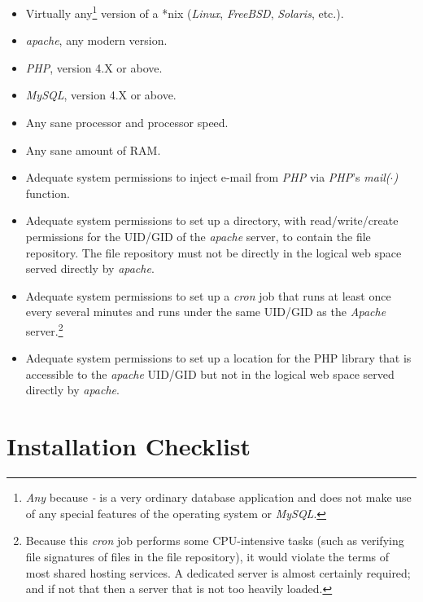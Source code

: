 \begin{itemize}
\item Virtually any\footnote{\emph{Any} because  
      \emph{\productbasename{}-\productversion{}} is a very ordinary
      database application and does not make use of any special
      features of the operating system or \emph{MySQL}.}
      version of a *nix (\emph{Linux}, \emph{FreeBSD}, 
      \emph{Solaris}, etc.).
\item {}\emph{apache}, any modern version.
\item {}\emph{PHP}, version 4.X or above.
\item {}\emph{MySQL}, version 4.X or above.
\item Any sane processor and processor speed.
\item Any sane amount of RAM.
\item Adequate system permissions to inject e-mail from \emph{PHP} via \emph{PHP}'s
      \emph{mail($\cdot{}$)} function.
\item Adequate system permissions to set up a directory, with 
      read/write/create permissions
      for the UID/GID of the \emph{apache} server, to contain the file repository.
      The file repository must not be directly in the logical web space served
      directly by \emph{apache}.
\item Adequate system permissions to set up a \emph{cron} job that runs
      at least once every several minutes and runs under the same UID/GID as the
      \emph{Apache} server.\footnote{Because this \emph{cron} job performs
      some CPU-intensive tasks (such as verifying file signatures of files in the
      file repository), it would violate
      the terms of most shared hosting services.  A dedicated server is
      almost certainly required; and if not that then a server that is not
      too heavily loaded.}
\item Adequate system permissions to set up a location for the PHP library
      that is accessible to the \emph{apache} UID/GID but not in the
      logical web space served directly by \emph{apache}.
\end{itemize}


\section{Installation Checklist}
\label{cist0:sick0}

